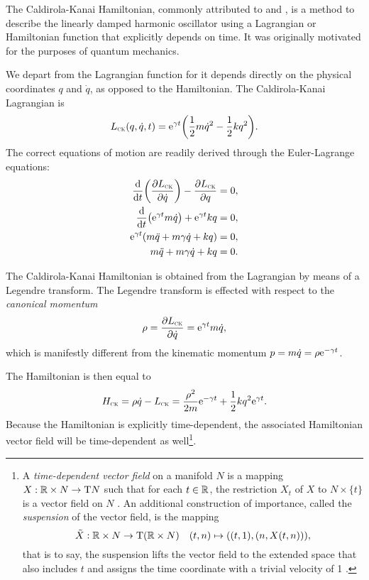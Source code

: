 The Caldirola-Kanai Hamiltonian, commonly attributed to \citet{Caldirola1941} and \citet{Kanai1948}, is a method to describe the linearly damped harmonic oscillator using a Lagrangian or Hamiltonian function that explicitly depends on time. It was originally motivated for the purposes of quantum mechanics.

We depart from the Lagrangian function for it depends directly on the physical coordinates \(q\) and \(\dot{q}\), as opposed to the Hamiltonian. The Caldirola-Kanai Lagrangian is
\begin{equation}
    L_\text{\tiny{\textsc{CK}}}(q, \dot{q}, t) = \mathrm{e}^{\gamma t}\qty(\frac{1}{2}m\dot{q}^2 - \frac{1}{2}kq^2).
    \label{eq:lag_CK}
\end{equation}
The correct equations of motion are readily derived through the Euler-Lagrange equations:
\begin{equation}
    \begin{split}
        \dv{}{t}\qty(\pdv{\ensuremath{L_\text{\tiny{\textsc{CK}}}}}{\dot{q}}) - \pdv{\ensuremath{L_\text{\tiny{\textsc{CK}}}}}{q} &= 0, \\
        \dv{}{t}\qty(\mathrm{e}^{\gamma t } m \dot{q}) + \mathrm{e}^{\gamma t} kq &= 0, \\
        \mathrm{e}^{\gamma t } \qty(m\ddot{q} + m\gamma\dot{q} + kq)  &= 0, \\
        m\ddot{q} + m\gamma\dot{q} + kq &= 0. \\
    \end{split}
\end{equation}

The Caldirola-Kanai Hamiltonian is obtained from the Lagrangian by means of a Legendre transform. The Legendre transform is effected with respect to the \emph{canonical momentum}
\begin{equation}
     \rho = \pdv{\ensuremath{L_\text{\tiny{\textsc{CK}}}}}{\dot{q}} = \mathrm{e}^{\gamma t} m \dot{q},
\end{equation}
which is manifestly different from the kinematic momentum \(p = m\dot{q} = \rho \mathrm{e}^{-\gamma t}\).

The Hamiltonian is then equal to
\begin{equation}
     H_\text{\tiny{\textsc{CK}}} = \rho\dot{q} - L_\text{\tiny{\textsc{CK}}} =  \frac{\rho^2}{2m}\mathrm{e}^{-\gamma t} + \frac{1}{2}kq^2\mathrm{e}^{\gamma t}.
\end{equation}
Because the Hamiltonian is explicitly time-dependent, the associated Hamiltonian vector field will be time-dependent as well\footnote
{A \emph{time-dependent vector field} on a manifold \(N\) is a mapping \(X: \mathbb{R} \times N \to \mathrm{T}N\) such that for each \(t \in \mathbb{R}\), the restriction \(X_t\) of \(X\) to \(N \times \{t\}\) is a vector field on \(N\) \cite{Libermann1987}. An additional construction of importance, called the \emph{suspension} of the vector field, is the mapping \begin{equation}
     \tilde{X}: \mathbb{R} \times N \to \mathrm{T}(\mathbb{R} \times N) \quad (t, n) \mapsto ((t, 1), (n, X(t, n))),
\end{equation} that is to say, the suspension lifts the vector field to the extended space that also includes \(t\) and assigns the time coordinate with a trivial velocity of 1 \cite{Abraham1978}.}.

